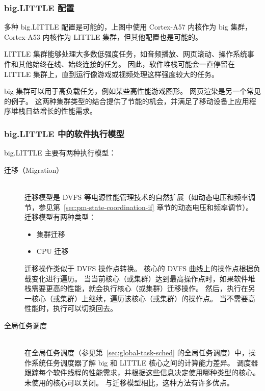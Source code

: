 
\subsubsection{big.LITTLE 配置}

多种 big.LITTLE 配置是可能的，上图中使用 Cortex-A57 内核作为 big 集群，Cortex-A53 内核作为 LITTLE 集群，但其他配置也是可能的。

LITTLE 集群能够处理大多数低强度任务，如音频播放、网页滚动、操作系统事件和其他始终在线、始终连接的任务。
因此，软件堆栈可能会一直停留在 LITTLE 集群上，直到运行像游戏或视频处理这样强度较大的任务。

big 集群可以用于高负载任务，例如某些高性能游戏图形。
网页渲染是另一个常见的例子。
这两种集群类型的结合提供了节能的机会，并满足了移动设备上应用程序堆栈日益增长的性能需求。

\subsubsection{big.LITTLE 中的软件执行模型}

big.LITTLE 主要有两种执行模型：

\begin{description}
  \item[{迁移（Migration）}] \hfill \\
    迁移模型是 DVFS 等电源性能管理技术的自然扩展（如动态电压和频率调节，参见第~\ref{sec:pm-state-coordination-if} 章节的动态电压和频率调节）。
    迁移模型有两种类型：

    \begin{itemize}
      \item 集群迁移
      \item CPU 迁移
    \end{itemize}

    迁移操作类似于 DVFS 操作点转换。
    核心的 DVFS 曲线上的操作点根据负载变化进行遍历。
    当当前核心（或集群）达到最高操作点时，如果软件堆栈需要更高的性能，就会执行核心（或集群）迁移操作。
    然后，执行在另一核心（或集群）上继续，遍历该核心（或集群）的操作点。
    当不需要高性能时，执行可以切换回去。

  \item[{全局任务调度}] \hfill \\
    在全局任务调度（参见第~\ref{sec:global-task-sched} 的全局任务调度）中，操作系统任务调度器了解 big 和 LITTLE 核心之间的计算能力差异。
    调度器跟踪每个软件线程的性能需求，并根据这些信息决定使用哪种类型的核心。
    未使用的核心可以关闭。
    与迁移模型相比，这种方法有许多优点。
\end{description}

